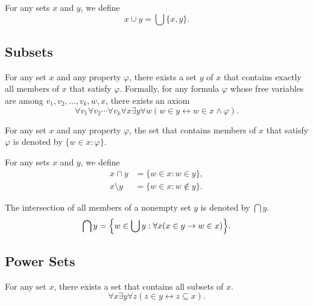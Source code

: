 \documentclass[11pt]{article}
\begin{document}
\begin{definition}
  For any sets $x$ and $y$, we define
  \begin{equation*}
    x \cup y = \bigcup \{x, y\}.
  \end{equation*}
\end{definition}

\subsection{Subsets}
\begin{axiomschema}[Separation]
  For any set $x$ and any property $\varphi$, there exists a set $y$ of $x$ that contains exactly all members of $x$ that satisfy $\varphi$.
  Formally, for any formula $\varphi$ whose free variables are among $v_1, v_2, \dots, v_k, w, x$, there exists an axiom
  \begin{equation*}
    \forall v_1 \forall v_2 \cdots \forall v_k \forall x \exists y \forall w (w \in y \leftrightarrow w \in x \wedge \varphi).
  \end{equation*}
\end{axiomschema}

\begin{definition}
  For any set $x$ and any property $\varphi$, the set that contains members of $x$ that satisfy $\varphi$ is denoted by $\{w \in x: \varphi\}$.
\end{definition}

\begin{definition}
  For any sets $x$ and $y$, we define
  \begin{align*}
    x \cap y &= \{w \in x: w \in y\}, \\
    x \setminus y &= \{w \in x: w \notin y\}.
  \end{align*}
\end{definition}

\begin{definition}
  The intersection of all members of a nonempty set $y$ is denoted by $\bigcap y$.
  \begin{equation*}
    \bigcap y = \Bigl\{w \in \bigcup y: \forall x (x \in y \to w \in x)\Bigr\}.
  \end{equation*}
\end{definition}

\subsection{Power Sets}
\begin{axiom}
  For any set $x$, there exists a set that contains all subsets of $x$.
  \begin{equation*}
    \forall x \exists y \forall z (z \in y \leftrightarrow z \subseteq x).
  \end{equation*}
\end{axiom}
\end{document}
